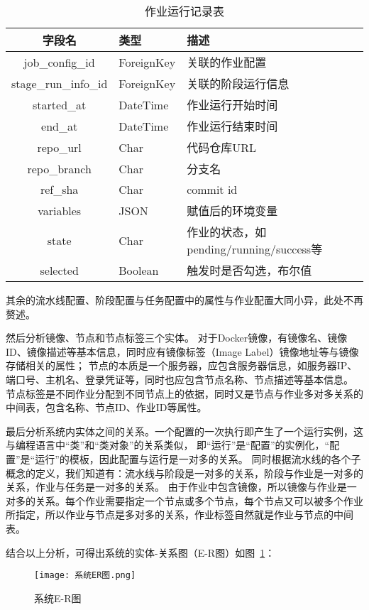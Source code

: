 \begin{table}[h]
  \centering
  \caption{作业运行记录表}
  \label{tab:作业运行记录表}
  \begin{tabular}{cll}
    \toprule
    字段名               & 类型          & 描述                                               \\
    \midrule
    job\_config\_id     & ForeignKey   & 关联的作业配置                                     \\
    stage\_run\_info\_id    & ForeignKey   & 关联的阶段运行信息                                 \\
    started\_at         & DateTime     & 作业运行开始时间                                   \\
    end\_at             & DateTime     & 作业运行结束时间                                   \\
    repo\_url           & Char         & 代码仓库URL                                      \\
    repo\_branch        & Char         & 分支名                                           \\
    ref\_sha            & Char         & commit id                                       \\
    variables           & JSON         & 赋值后的环境变量                                  \\
    state               & Char         & 作业的状态，如pending/running/success等            \\
    selected            & Boolean      & 触发时是否勾选，布尔值                             \\
    \bottomrule
  \end{tabular}
\end{table}

其余的流水线配置、阶段配置与任务配置中的属性与作业配置大同小异，此处不再赘述。

然后分析镜像、节点和节点标签三个实体。
对于Docker镜像，有镜像名、镜像ID、镜像描述等基本信息，同时应有镜像标签（Image Label）镜像地址等与镜像存储相关的属性；
节点的本质是一个服务器，应包含服务器信息，如服务器IP、端口号、主机名、登录凭证等，同时也应包含节点名称、节点描述等基本信息。
节点标签是不同作业分配到不同节点上的依据，同时又是节点与作业多对多关系的中间表，包含名称、节点ID、作业ID等属性。

最后分析系统内实体之间的关系。一个配置的一次执行即产生了一个运行实例，这与编程语言中“类”和“类对象”的关系类似，
即“运行”是“配置”的实例化，“配置”是“运行”的模板，因此配置与运行是一对多的关系。
同时根据流水线的各个子概念的定义，我们知道有：流水线与阶段是一对多的关系，阶段与作业是一对多的关系，作业与任务是一对多的关系。
由于作业中包含镜像，所以镜像与作业是一对多的关系。每个作业需要指定一个节点或多个节点，每个节点又可以被多个作业所指定，所以作业与节点是多对多的关系，作业标签自然就是作业与节点的中间表。

结合以上分析，可得出系统的实体-关系图（E-R图）如图~\ref{fig:系统E-R图}：

\begin{figure}[h]
  \centering
  \texttt{[image: 系统ER图.png]}
  \caption{系统E-R图}
  \label{fig:系统E-R图}
\end{figure}


